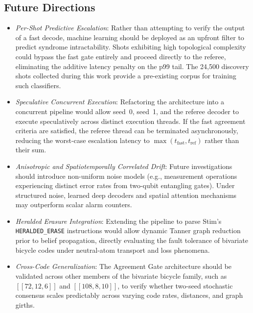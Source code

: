 \subsection{Future Directions}

\begin{itemize}
    \item \textit{Per-Shot Predictive Escalation}: Rather than attempting to verify the output of a fast decode, machine learning should be deployed as an upfront filter to predict syndrome intractability. Shots exhibiting high topological complexity could bypass the fast gate entirely and proceed directly to the referee, eliminating the additive latency penalty on the p99 tail. The 24,500 discovery shots collected during this work provide a pre-existing corpus for training such classifiers.
    \item \textit{Speculative Concurrent Execution}: Refactoring the architecture into a concurrent pipeline would allow seed~0, seed~1, and the referee decoder to execute speculatively across distinct execution threads. If the fast agreement criteria are satisfied, the referee thread can be terminated asynchronously, reducing the worst-case escalation latency to $\max(t_{\text{fast}}, t_{\text{ref}})$ rather than their sum.
    \item \textit{Anisotropic and Spatiotemporally Correlated Drift}: Future investigations should introduce non-uniform noise models (e.g., measurement operations experiencing distinct error rates from two-qubit entangling gates). Under structured noise, learned deep decoders and spatial attention mechanisms may outperform scalar alarm counters.
    \item \textit{Heralded Erasure Integration}: Extending the pipeline to parse Stim's \texttt{HERALDED\_ERASE} instructions would allow dynamic Tanner graph reduction prior to belief propagation, directly evaluating the fault tolerance of bivariate bicycle codes under neutral-atom transport and loss phenomena.
    \item \textit{Cross-Code Generalization}: The Agreement Gate architecture should be validated across other members of the bivariate bicycle family, such as $[[72, 12, 6]]$ and $[[108, 8, 10]]$, to verify whether two-seed stochastic consensus scales predictably across varying code rates, distances, and graph girths.
\end{itemize}
